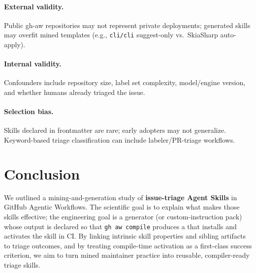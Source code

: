 \documentclass[sigconf,review,anonymous]{acmart}
\newcommand{\filepath}[1]{{\path{#1}}}
\begin{document}
\paragraph{External validity.}
Public gh-aw repositories may not represent private deployments; generated
skills may overfit mined templates (e.g., \texttt{cli/cli} suggest-only vs.\
SkiaSharp auto-apply).

\paragraph{Internal validity.}
Confounders include repository size, label set complexity, model/engine version,
and whether humans already triaged the issue.

\paragraph{Selection bias.}
Skills declared in frontmatter are rare; early adopters may not generalize.
Keyword-based triage classification can include labeler/PR-triage workflows.

\section{Conclusion}
\label{sec:conclusion}

We outlined a mining-and-generation study of \textbf{issue-triage Agent Skills}
in GitHub Agentic Workflows.
The scientific goal is to explain what makes those skills effective; the
engineering goal is a generator (or custom-instruction pack) whose output is
declared so that \texttt{gh aw compile} produces a \filepath{.lock.yml} that
installs and activates the skill in CI.
By linking intrinsic skill properties and sibling artifacts to triage outcomes,
and by treating compile-time activation as a first-class success criterion, we
aim to turn mined maintainer practice into reusable, compiler-ready triage
skills.

\balance


\end{document}
